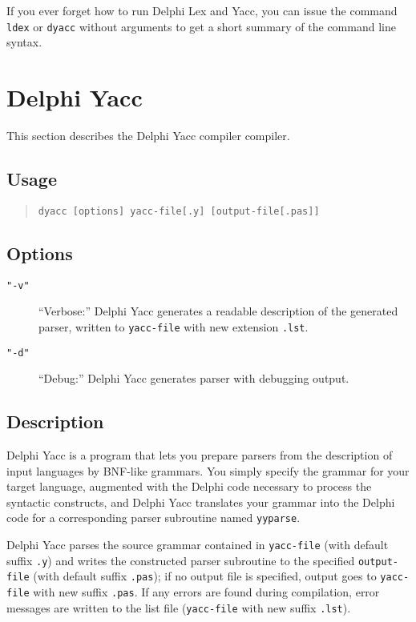 \documentclass[a4paper]{article}
\begin{document}
If you ever forget how to run Delphi Lex and Yacc, you can issue the command
\verb"ldex" or \verb"dyacc" without arguments to get a short 
summary of the command line syntax.

\newpage

\section{Delphi Yacc}

This section describes the Delphi Yacc compiler compiler.

\subsection{Usage}

\begin{quote}\begin{verbatim}
dyacc [options] yacc-file[.y] [output-file[.pas]]
\end{verbatim}\end{quote}

\subsection{Options}

\begin{description}
   \item[\tt"-v"]
      ``Verbose:'' Delphi Yacc generates a readable description of the generated
      parser, written to \verb"yacc-file" with new extension \verb".lst".
   \item[\tt"-d"]
      ``Debug:'' Delphi Yacc generates parser with debugging output.
\end{description}

\subsection{Description}

Delphi Yacc is a program that lets you prepare parsers from the description
of input languages by BNF-like grammars. You simply specify the grammar
for your target language, augmented with the Delphi code necessary
to process the syntactic constructs, and Delphi Yacc translates your grammar
into the Delphi code for a corresponding parser subroutine named
\verb"yyparse".

Delphi Yacc parses the source grammar contained in \verb"yacc-file" (with default
suffix \verb".y") and writes the constructed parser subroutine to the
specified \verb"output-file" (with default suffix \verb".pas"); if no output
file is specified, output goes to \verb"yacc-file" with new suffix
\verb".pas". If any errors are found during compilation, error messages are
written to the list file (\verb"yacc-file" with new suffix \verb".lst").
\end{document}
